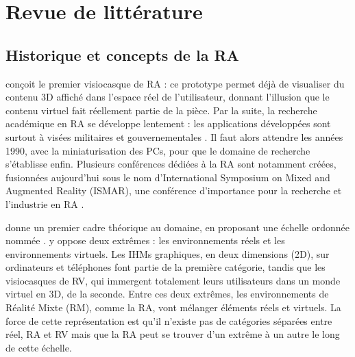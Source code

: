 \chapter{Revue de littérature}
\label{ch:litterature}

\section{Historique et concepts de la RA}
\label{sec:litterature_ar_presentation}

\cite{Sutherland1968} conçoit le premier visiocasque de RA  : ce prototype permet déjà de visualiser du contenu 3D affiché dans l'espace réel de l'utilisateur, donnant l'illusion que le contenu virtuel fait réellement partie de la pièce. Par la suite, la recherche académique en RA se développe lentement : les applications développées sont surtout à visées militaires et gouvernementales \citep{VanKrevelen2010}. Il faut alors attendre les années 1990, avec la miniaturisation des PCs, pour que le domaine de recherche s'établisse enfin. Plusieurs conférences dédiées à la RA sont notamment créées, fusionnées aujourd'hui sous le nom d'International Symposium on Mixed and Augmented Reality (ISMAR), une conférence d'importance pour la recherche et l'industrie en RA \citep{Azuma2001}.


\cite{Milgram1994} donne un premier cadre théorique au domaine, en proposant une échelle ordonnée nommée  . \citeauthor{Milgram1994} y oppose deux extrêmes : les environnements réels et les environnements virtuels. Les IHMs graphiques, en deux dimensions (2D), sur ordinateurs et téléphones font partie de la première catégorie, tandis que les visiocasques de RV, qui immergent totalement leurs utilisateurs dans un monde virtuel en 3D, de la seconde. Entre ces deux extrêmes, les environnements de Réalité Mixte (RM), comme la RA, vont mélanger éléments réels et virtuels. La force de cette représentation est qu'il n'existe pas de catégories séparées entre réel, RA et RV mais que la RA peut se trouver d'un extrême à un autre le long de cette échelle.

